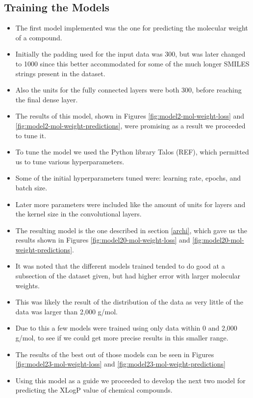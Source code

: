     \subsection{Training the Models}
    \begin{itemize}
        \item The first model implemented was the one for predicting the molecular weight of a compound.
        \item Initially the padding used for the input data was 300, but was later changed to 1000 since this better accommodated for some of the much longer SMILES strings present in the dataset.
        \item Also the units for the fully connected layers were both 300, before reaching the final dense layer. 
        \item The results of this model, shown in Figures \ref{fig:model2-mol-weight-loss} and \ref{fig:model2-mol-weight-predictions}, were promising as a result we proceeded to tune it.
        \item To tune the model we used the Python library Talos (REF), which permitted us to tune various hyperparameters.
        \item Some of the initial hyperparameters tuned were: learning rate, epochs, and batch size. \item Later more parameters were included like the amount of units for layers and the kernel size in the convolutional layers.
        \item The resulting model is the one described in section \ref{archi}, which gave us the results shown in Figures \ref{fig:model20-mol-weight-loss} and \ref{fig:model20-mol-weight-predictions}.
        \item It was noted that the different models trained tended to do good at a subsection of the dataset given, but had higher error with larger molecular weights.
        \item This was likely the result of the distribution of the data as very little of the data was larger than 2,000 g/mol.
        \item Due to this a few models were trained using only data within 0 and 2,000 g/mol, to see if we could get more precise results in this smaller range.
        \item The results of the best out of those models can be seen in Figures \ref{fig:model23-mol-weight-loss} and \ref{fig:model23-mol-weight-predictions}
        \item Using this model as a guide we proceeded to develop the next two model for predicting the XLogP value of chemical compounds.

\end{itemize}

